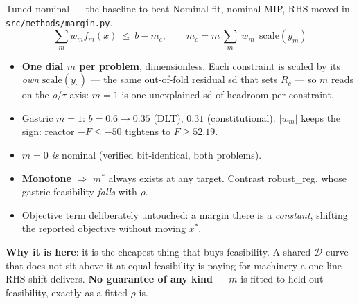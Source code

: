 \documentclass{beamer}
\begin{document}
\begin{frame}{Tuned nominal --- the baseline to beat}
  \small
  Nominal fit, nominal MIP, RHS moved in. \texttt{src/methods/margin.py}.
  \vspace{-0.4em}
  \[
    \sum_m w_m f_m(x)\ \le\ b - m_c,
    \qquad m_c = m\,\sum_m |w_m|\,\mathrm{scale}(y_m)
  \]
  \vspace{-1.3em}
  \begin{itemize}
    \item \textbf{One dial $m$ per problem}, dimensionless. Each constraint is
      scaled by its \emph{own} $\mathrm{scale}(y_c)$ --- the same out-of-fold
      residual sd that sets $R_c$ --- so $m$ reads on the $\rho$/$\tau$ axis:
      $m{=}1$ is one unexplained sd of headroom per constraint.
    \item Gastric $m{=}1$: $b{=}0.6\to 0.35$ (DLT), $0.31$ (constitutional).
      $|w_m|$ keeps the sign: reactor $-F\le-50$ tightens to $F\ge52.19$.
    \item $m{=}0$ \emph{is} nominal (verified bit-identical, both problems).
    \item \textbf{Monotone} $\Rightarrow$ $m^\ast$ always exists at any target.
      Contrast robust\_reg, whose gastric feasibility \emph{falls} with $\rho$.
    \item Objective term deliberately untouched: a margin there is a
      \emph{constant}, shifting the reported objective without moving $x^\ast$.
  \end{itemize}
  \smallskip
  \textbf{Why it is here}: it is the cheapest thing that buys feasibility. A
  shared-$\mathcal D$ curve that does not sit above it at equal feasibility is
  paying for machinery a one-line RHS shift delivers. \textbf{No guarantee of any
  kind} --- $m$ is fitted to held-out feasibility, exactly as a fitted $\rho$ is.
\end{frame}
\end{document}
